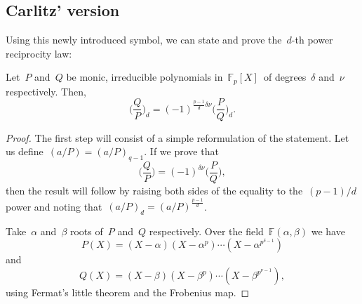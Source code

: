 \subsection{Carlitz' version}

Using this newly introduced symbol, we can state and prove the~${d}$-th power reciprocity law:
\begin{theorem}
  Let~${P}$ and~${Q}$ be monic, irreducible polynomials in~${\mathbb{F}_{p}[X]}$ of degrees~${\delta}$ and~${\nu}$ respectively. Then,
  \begin{equation}
    \bigg( \frac{Q}{P} \bigg)_{d} = (-1)^{\frac{p-1}{d}\delta \nu} \bigg( \frac{P}{Q} \bigg)_{d}.
  \end{equation}
  
  \begin{proof}
    The first step will consist of a simple reformulation of the statement. Let us define~${(a/P)=(a/P)_{q-1}}$. If we prove that
    \begin{equation}
      \bigg( \frac{Q}{P} \bigg) = (-1)^{\delta \nu} \bigg( \frac{P}{Q} \bigg),
    \end{equation}
    then the result will follow by raising both sides of the equality to the~${(p-1)/d}$ power and noting that~${(a/P)_{d}=(a/P)^{\frac{p-1}{d}}}$.
    
    Take~${\alpha}$ and~${\beta}$ roots of~${P}$ and~${Q}$ respectively. Over the field~${\mathbb{F}(\alpha,\beta)}$ we have
    \begin{equation}
      P(X)=(X-\alpha)(X - \alpha^{p}) \cdots (X-\alpha^{p^{\delta-1}})
    \end{equation}
    and
    \begin{equation}
      Q(X)=(X-\beta)(X-\beta^{p}) \cdots (X-\beta^{p^{\nu-1}}),
    \end{equation}
    using Fermat's little theorem and the Frobenius map.
    

\end{proof}
\end{theorem}
